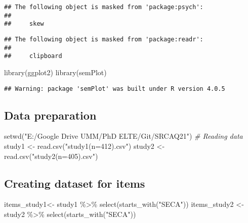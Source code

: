 \documentclass[
]{article}
\newenvironment{Shaded}{\begin{snugshade}}{\end{snugshade}}
\newcommand{\CommentTok}[1]{\textcolor[rgb]{0.56,0.35,0.01}{\textit{#1}}}
\newcommand{\FunctionTok}[1]{\textcolor[rgb]{0.00,0.00,0.00}{#1}}
\newcommand{\NormalTok}[1]{#1}
\newcommand{\OtherTok}[1]{\textcolor[rgb]{0.56,0.35,0.01}{#1}}
\newcommand{\SpecialCharTok}[1]{\textcolor[rgb]{0.00,0.00,0.00}{#1}}
\newcommand{\StringTok}[1]{\textcolor[rgb]{0.31,0.60,0.02}{#1}}
\begin{document}
\begin{verbatim}
## The following object is masked from 'package:psych':
## 
##     skew
\end{verbatim}

\begin{verbatim}
## The following object is masked from 'package:readr':
## 
##     clipboard
\end{verbatim}

\begin{Shaded}
\begin{Highlighting}[]
\FunctionTok{library}\NormalTok{(ggplot2)}
\FunctionTok{library}\NormalTok{(semPlot)}
\end{Highlighting}
\end{Shaded}

\begin{verbatim}
## Warning: package 'semPlot' was built under R version 4.0.5
\end{verbatim}

\hypertarget{data-preparation}{%
\subsection{Data preparation}\label{data-preparation}}

\begin{Shaded}
\begin{Highlighting}[]
\FunctionTok{setwd}\NormalTok{(}\StringTok{"E:/Google Drive UMM/PhD ELTE/Git/SRCAQ21"}\NormalTok{)}
\CommentTok{\# Reading data}
\NormalTok{study1 }\OtherTok{\textless{}{-}} \FunctionTok{read.csv}\NormalTok{(}\StringTok{"study1(n=412).csv"}\NormalTok{)}
\NormalTok{study2 }\OtherTok{\textless{}{-}} \FunctionTok{read.csv}\NormalTok{(}\StringTok{"study2(n=405).csv"}\NormalTok{)}
\end{Highlighting}
\end{Shaded}

\hypertarget{creating-dataset-for-items}{%
\subsection{Creating dataset for
items}\label{creating-dataset-for-items}}

\begin{Shaded}
\begin{Highlighting}[]
\NormalTok{items\_study1}\OtherTok{\textless{}{-}}\NormalTok{ study1 }\SpecialCharTok{\%\textgreater{}\%} 
  \FunctionTok{select}\NormalTok{(}\FunctionTok{starts\_with}\NormalTok{(}\StringTok{"SECA"}\NormalTok{))}
\NormalTok{items\_study2 }\OtherTok{\textless{}{-}}\NormalTok{ study2 }\SpecialCharTok{\%\textgreater{}\%} 
  \FunctionTok{select}\NormalTok{(}\FunctionTok{starts\_with}\NormalTok{(}\StringTok{"SECA"}\NormalTok{))}
\end{Highlighting}
\end{Shaded}
\end{document}

